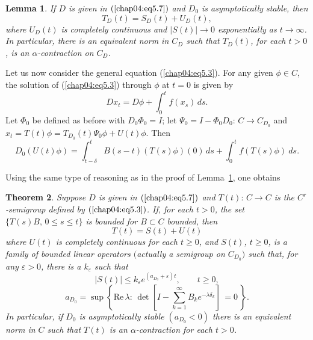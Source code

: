 \documentclass{surv-l}
\theoremstyle{plain}
\newtheorem{theorem}{Theorem}[section]
\newtheorem{lemma}[theorem]{Lemma}
\theoremstyle{definition}
\numberwithin{equation}{section}
\numberwithin{figure}{chapter}
\begin{document}
\begin{lemma}\label{lem4.5.2} If $D$ is given in $(\ref{chap04:eq5.7})$ and $D_{0}$ is asymptotically stable, then
\begin{equation*}
T_{D}(t)=S_{D}(t)+U_{D}(t),
\end{equation*}
where $U_{D}(t)$ is completely continuous and $|S(t)|\rightarrow 0$ exponentially as $t\rightarrow\infty$. In particular, there is an equivalent norm in $C_{D}$ such that $T_{D}(t)$, for each $t>0$, is an $\alpha$-contraction on $C_{D}$.
\end{lemma}



Let us now consider the general equation (\ref{chap04:eq5.3}). For any given $\phi\in C$, the solution of (\ref{chap04:eq5.3}) through $\phi$ at $t=0$ is given by
\begin{equation*}
Dx_{t}=D\phi+\int_{0}^{t}f(x_{s})\,ds.
\end{equation*}
Let $\Phi_{0}$ be defined as before with $D_{0}\Phi_{0}=I$; let $\Psi_{0}=I-\Phi_{0}D_{0}:\,C\rightarrow C_{D_{0}}$ and $x_{t}=T(t)\phi=T_{D_{0}}(t)\Psi_{0}\phi+U(t)\phi$. Then
\begin{equation*}
D_{0}(U(t)\phi)=\int_{t-\delta}^{t}B(s-t)(T(s)\phi)(0)\,ds+\int_{0}^{t}f(T(s)\phi)\ ds.
\end{equation*}

Using the same type of reasoning as in the proof of Lemma~\ref{lem4.5.2}, one obtains

\begin{theorem}\label{thm4.5.3} Suppose $D$ is given in $(\ref{chap04:eq5.7})$ and $T(t):\,C\rightarrow C$ is the $C^{r}$-semigroup defined by $(\ref{chap04:eq5.3})$. If, for each $t>0$, the set $\{T(s)B,\, 0\leq s\leq t\}$ is bounded for $B\subset C$ bounded, then
\begin{equation}\label{chap04:eq5.14}
T(t)=S(t)+U(t)
\end{equation}
where $U(t)$ is completely continuous for each $t\geq 0$, and $S(t)$, $t\geq 0$, is a family of bounded linear operators $($actually a semigroup on $C_{D_{0}})$ such that, for any $\varepsilon >0$, there is a $k_{\varepsilon}$ such that
\begin{equation*}
|S(t)|\leq k_{\varepsilon}e^{(a_{D_{0}}+\varepsilon)t},\qquad t\geq 0,
\end{equation*}
\begin{equation*}
a_{D_{0}}=\sup\left\{\mathrm{Re}\,\lambda:\,\det\left[I-\sum_{k=1}^{\infty}B_{k}e^{-\lambda\delta_{k}}\right]\,=0\,\right\}.
\end{equation*}
In particular, if $D_{0}$ is asymptotically stable $(a_{D_{0}}<0)$ there is an equivalent norm in $C$ such that $T(t)$ is an $\alpha$-contraction for each $t>0$.
\end{theorem}
\end{document}
